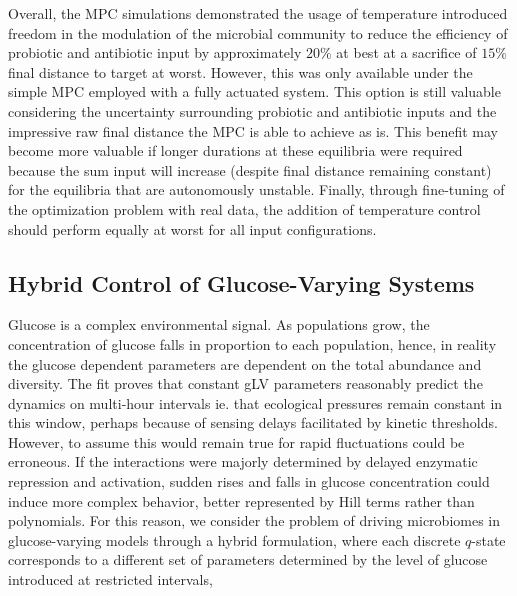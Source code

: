 \documentclass[twocolumn, 10pt]{report}
\begin{document}
{Overall, the MPC simulations demonstrated the usage of temperature introduced freedom in the modulation of the microbial community to reduce the efficiency of probiotic and antibiotic input by approximately $20\%$ at best at a sacrifice of $15\%$ final distance to target at worst. However, this was only available under the simple MPC employed with a fully actuated system. This option is still valuable considering the uncertainty surrounding probiotic and antibiotic inputs and the impressive raw final distance the MPC is able to achieve as is. This benefit may become more valuable if longer durations at these equilibria were required because the sum input will increase (despite final distance remaining constant) for the equilibria that are autonomously unstable. Finally, through fine-tuning of the optimization problem with real data, the addition of temperature control should perform equally at worst for all input configurations.

\subsection*{Hybrid Control of Glucose-Varying Systems}

\indent \indent Glucose is a complex environmental signal. As populations grow, the concentration of glucose falls in proportion to each population, hence, in reality the glucose dependent parameters are dependent on the total abundance and diversity. The fit proves that constant gLV parameters reasonably predict the dynamics on multi-hour intervals ie. that ecological pressures remain constant in this window, perhaps because of sensing delays facilitated by kinetic thresholds. However, to assume this would remain true for rapid fluctuations could be erroneous. If the interactions were majorly determined by delayed enzymatic repression and activation, sudden rises and falls in glucose concentration could induce more complex behavior, better represented by Hill terms rather than polynomials. For this reason, we consider the problem of driving microbiomes in glucose-varying models through a hybrid formulation, where each discrete $q$-state corresponds to a different set of parameters determined by the level of glucose introduced at restricted intervals,


}
\end{document}
